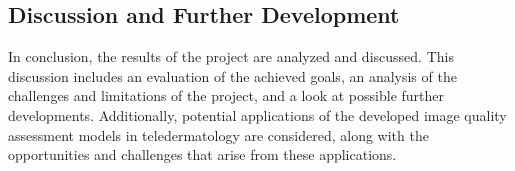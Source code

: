 \subsection{Discussion and Further Development}
\label{sub:DiscussionDevelopment}
In conclusion, the results of the project are analyzed and discussed. This discussion includes an evaluation of the achieved goals, an analysis of the challenges and limitations of the project, and a look at possible further developments. Additionally, potential applications of the developed image quality assessment models in teledermatology are considered, along with the opportunities and challenges that arise from these applications. \par